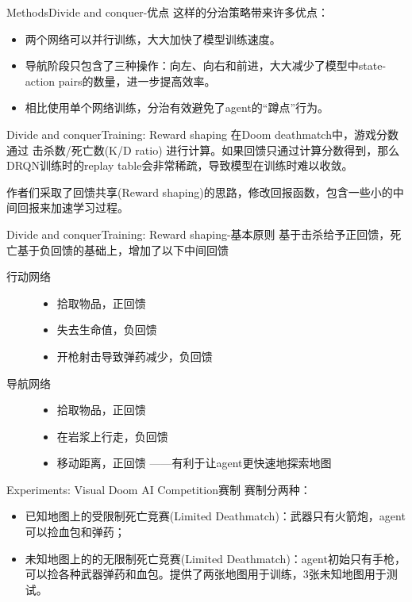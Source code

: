 \documentclass[10pt]{beamer}
\begin{document}
	\begin{frame}{Methods}{Divide and conquer-优点}
		这样的分治策略带来许多优点：
		\begin{itemize}
			\item<2-> 两个网络可以并行训练，大大加快了模型训练速度。
			\item<3-> 导航阶段只包含了三种操作：向左、向右和前进，大大减少了模型中state-action pairs的数量，进一步提高效率。
			\item<4-> 相比使用单个网络训练，分治有效避免了agent的“蹲点”行为。
			
		\end{itemize}
	\end{frame}

	\begin{frame}{Divide and conquer}{Training: Reward shaping}
		在Doom deathmatch中，游戏分数通过 击杀数/死亡数(K/D ratio) 进行计算。如果回馈只通过计算分数得到，那么DRQN训练时的replay table会非常稀疏，导致模型在训练时难以收敛。
		
		作者们采取了回馈共享(Reward shaping)的思路，修改回报函数，包含一些小的中间回报来加速学习过程。
		
	\end{frame}

	\begin{frame}{Divide and conquer}{Training: Reward shaping-基本原则}
		基于击杀给予正回馈，死亡基于负回馈的基础上，增加了以下中间回馈
		\begin{description}
			\item[行动网络] 
				\begin{itemize}
					\item 拾取物品，正回馈
					\item 失去生命值，负回馈
					\item 开枪射击导致弹药减少，负回馈
				\end{itemize}
			\item [导航网络]
				\begin{itemize}
					\item 拾取物品，正回馈
					\item 在岩浆上行走，负回馈
					\item 移动距离，正回馈  ——有利于让agent更快速地探索地图
				\end{itemize}
		\end{description}
	\end{frame}

	\begin{frame}{Experiments: Visual Doom AI Competition}{赛制}
		赛制分两种：
		\begin{itemize}
			\item 已知地图上的受限制死亡竞赛(Limited Deathmatch)：武器只有火箭炮，agent可以捡血包和弹药；
			
			\item 未知地图上的的无限制死亡竞赛(Limited Deathmatch)：agent初始只有手枪，可以捡各种武器弹药和血包。提供了两张地图用于训练，3张未知地图用于测试。
		\end{itemize}
	\end{frame}
\end{document}

